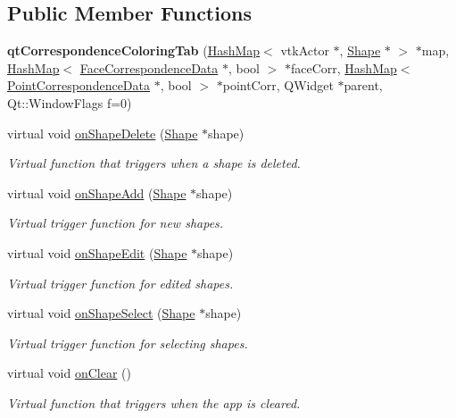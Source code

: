 \subsection*{Public Member Functions}
\begin{DoxyCompactItemize}
\item 
\hypertarget{classqt_correspondence_coloring_tab_a8f793bb0b1e4fcd2930a6fc8dda03ff4}{}{\bfseries qt\+Correspondence\+Coloring\+Tab} (\hyperlink{class_hash_map}{Hash\+Map}$<$ vtk\+Actor $\ast$, \hyperlink{class_shape}{Shape} $\ast$ $>$ $\ast$map, \hyperlink{class_hash_map}{Hash\+Map}$<$ \hyperlink{class_face_correspondence_data}{Face\+Correspondence\+Data} $\ast$, bool $>$ $\ast$face\+Corr, \hyperlink{class_hash_map}{Hash\+Map}$<$ \hyperlink{class_point_correspondence_data}{Point\+Correspondence\+Data} $\ast$, bool $>$ $\ast$point\+Corr, Q\+Widget $\ast$parent, Qt\+::\+Window\+Flags f=0)\label{classqt_correspondence_coloring_tab_a8f793bb0b1e4fcd2930a6fc8dda03ff4}

\item 
virtual void \hyperlink{classqt_correspondence_coloring_tab_a731f7da293d21c87059515a10d36d1e3}{on\+Shape\+Delete} (\hyperlink{class_shape}{Shape} $\ast$shape)
\begin{DoxyCompactList}\small\item\em Virtual function that triggers when a shape is deleted. \end{DoxyCompactList}\item 
virtual void \hyperlink{classqt_correspondence_coloring_tab_aa42744063025d9b0d29b9a83817c0f27}{on\+Shape\+Add} (\hyperlink{class_shape}{Shape} $\ast$shape)
\begin{DoxyCompactList}\small\item\em Virtual trigger function for new shapes. \end{DoxyCompactList}\item 
virtual void \hyperlink{classqt_correspondence_coloring_tab_a30c174762eda93581d7f93bf4d247788}{on\+Shape\+Edit} (\hyperlink{class_shape}{Shape} $\ast$shape)
\begin{DoxyCompactList}\small\item\em Virtual trigger function for edited shapes. \end{DoxyCompactList}\item 
virtual void \hyperlink{classqt_correspondence_coloring_tab_af02e0bad7197ef2a4fba5e67a6d5f4e2}{on\+Shape\+Select} (\hyperlink{class_shape}{Shape} $\ast$shape)
\begin{DoxyCompactList}\small\item\em Virtual trigger function for selecting shapes. \end{DoxyCompactList}\item 
virtual void \hyperlink{classqt_correspondence_coloring_tab_a3f5f147052eb9b10c08af1160ff85f42}{on\+Clear} ()
\begin{DoxyCompactList}\small\item\em Virtual function that triggers when the app is cleared. \end{DoxyCompactList}\end{DoxyCompactItemize}
